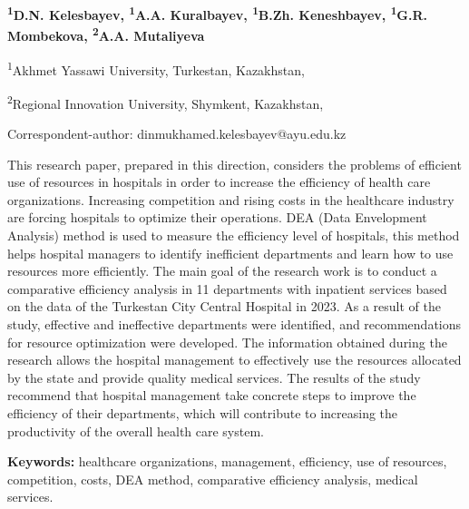 
\begin{articleheader}

{\bfseries
\textsuperscript{1}D.N. Kelesbayev\textsuperscript{\envelope },
\textsuperscript{1}A.A. Kuralbayev,
\textsuperscript{1}B.Zh. Keneshbayev,
\textsuperscript{1}G.R. Mombekova,
\textsuperscript{2}A.A. Mutaliyeva
}
\end{articleheader}

\begin{affiliation}
\textsuperscript{1}Akhmet Yassawi University, Turkestan, Kazakhstan,

\textsuperscript{2}Regional Innovation University, Shymkent, Kazakhstan,

\raggedright \textsuperscript{\envelope }Correspondent-author: dinmukhamed.kelesbayev@ayu.edu.kz
\end{affiliation}

This research paper, prepared in this direction, considers the problems
of efficient use of resources in hospitals in order to increase the
efficiency of health care organizations. Increasing competition and
rising costs in the healthcare industry are forcing hospitals to
optimize their operations. DEA (Data Envelopment Analysis) method is
used to measure the efficiency level of hospitals, this method helps
hospital managers to identify inefficient departments and learn how to
use resources more efficiently. The main goal of the research work is to
conduct a comparative efficiency analysis in 11 departments with
inpatient services based on the data of the Turkestan City Central
Hospital in 2023. As a result of the study, effective and ineffective
departments were identified, and recommendations for resource
optimization were developed. The information obtained during the
research allows the hospital management to effectively use the resources
allocated by the state and provide quality medical services. The results
of the study recommend that hospital management take concrete steps to
improve the efficiency of their departments, which will contribute to
increasing the productivity of the overall health care system.

{\bfseries Keywords:} healthcare organizations, management, efficiency, use
of resources, competition, costs, DEA method, comparative efficiency
analysis, medical services.

